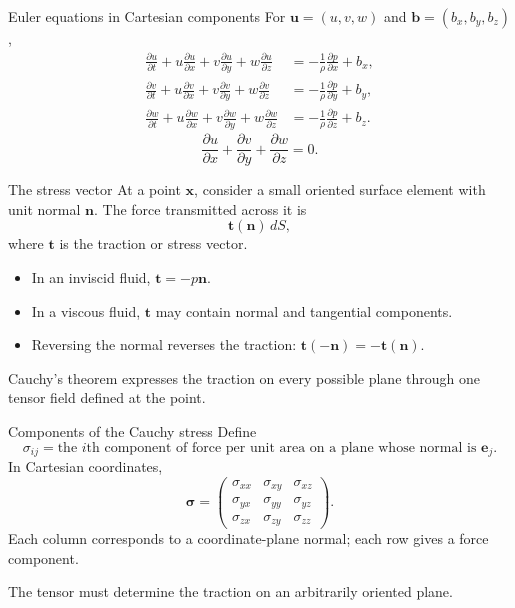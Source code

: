 \documentclass[aspectratio=169,11pt]{beamer}
\newcommand{\uvec}{\bm{u}}
\newcommand{\xvec}{\bm{x}}
\newcommand{\nvec}{\bm{n}}
\newcommand{\bvec}{\bm{b}}
\newcommand{\tvec}{\bm{t}}
\newcommand{\stress}{\bm{\sigma}}
\begin{document}
\begin{frame}{Euler equations in Cartesian components}
For $\uvec=(u,v,w)$ and $\bvec=(b_x,b_y,b_z)$,
\begin{align*}
  \frac{\partial u}{\partial t}
  +u\frac{\partial u}{\partial x}
  +v\frac{\partial u}{\partial y}
  +w\frac{\partial u}{\partial z}
  &=-\frac{1}{\rho}\frac{\partial p}{\partial x}+b_x,\\[3pt]
  \frac{\partial v}{\partial t}
  +u\frac{\partial v}{\partial x}
  +v\frac{\partial v}{\partial y}
  +w\frac{\partial v}{\partial z}
  &=-\frac{1}{\rho}\frac{\partial p}{\partial y}+b_y,\\[3pt]
  \frac{\partial w}{\partial t}
  +u\frac{\partial w}{\partial x}
  +v\frac{\partial w}{\partial y}
  +w\frac{\partial w}{\partial z}
  &=-\frac{1}{\rho}\frac{\partial p}{\partial z}+b_z.
\end{align*}
\[
  \frac{\partial u}{\partial x}
  +\frac{\partial v}{\partial y}
  +\frac{\partial w}{\partial z}=0.
\]
\end{frame}

\begin{frame}{The stress vector}
At a point $\xvec$, consider a small oriented surface element with unit normal $\nvec$. The force transmitted across it is
\[
  \tvec(\nvec)\,dS,
\]
where $\tvec$ is the traction or stress vector.
\begin{itemize}\itemsep6pt
  \item In an inviscid fluid, $\tvec=-p\nvec$.
  \item In a viscous fluid, $\tvec$ may contain normal and tangential components.
  \item Reversing the normal reverses the traction: $\tvec(-\nvec)=-\tvec(\nvec)$.
\end{itemize}
\begin{punchbox}
\small Cauchy's theorem expresses the traction on every possible plane through one tensor field defined at the point.
\end{punchbox}
\end{frame}

\begin{frame}{Components of the Cauchy stress}
Define
\[
  \sigma_{ij}
  =\text{the $i$th component of force per unit area on a plane whose normal is $\bm e_j$}.
\]
In Cartesian coordinates,
\[
  \stress=
  \begin{pmatrix}
  \sigma_{xx}&\sigma_{xy}&\sigma_{xz}\\
  \sigma_{yx}&\sigma_{yy}&\sigma_{yz}\\
  \sigma_{zx}&\sigma_{zy}&\sigma_{zz}
  \end{pmatrix}.
\]
Each column corresponds to a coordinate-plane normal; each row gives a force component.

\medskip
The tensor must determine the traction on an arbitrarily oriented plane.
\end{frame}
\end{document}
